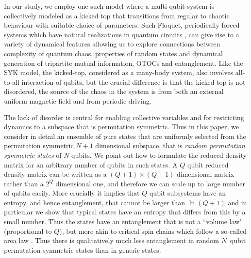 \documentclass[pre,aps,showpacs,showkeys,twocolumn]{revtex4-1}
\theoremstyle{definition}
\theoremstyle{remark}
\begin{document}
In our study, we employ one such model where a multi-qubit system is collectively modeled as a kicked top  \cite{Haake, kus1987symmetry, kus88, Zyczkowski90} that transitions from regular to chaotic behaviour with suitable choice of parameters. Such Floquet, periodically forced systems which have natural realizations in quantum circuits \cite{emerson2003pseudo}, can give rise to a variety of dynamical features allowing us to explore connections between complexity of quantum chaos, properties of random states and dynamical generation of tripartite mutual information, OTOCs and entanglement. Like the SYK model, the kicked-top, considered as a many-body system, also involves all-to-all interaction of qubits, but the crucial difference is that the kicked top is not disordered, the source of the chaos in the system is from both an external uniform magnetic field and from periodic driving. 

The lack of disorder is central for enabling collective variables and for restricting dynamics to a subspace that is permutation symmetric.   
Thus in this paper, we consider in detail an ensemble of pure states that are uniformly selected from the permutation symmetric $N + 1$ dimensional subspace, that is {\it random permutation symmetric states} of $N$ qubits. We point out how to formulate the reduced density matrix for an arbitrary number of qubits in such states. A $Q$ qubit reduced density matrix can be written as a $(Q+1) \times (Q+1)$ dimensional matrix rather than a $2^Q$ dimensional one, and therefore we can scale up to large number of qubits easily. More crucially it implies that $Q$ qubit subsystems have an entropy, and hence entanglement, that cannot be larger than $\ln(Q+1)$ and in particular we show that typical states have an entropy that differs from this by a small number. Thus the states have an entanglement that is not a ``volume law" (proportional to $Q$), but more akin to critical spin chains \cite{Vidal2003} which follow a so-called area law \cite{latorre2005entanglement, popkov2005entangling, popkov2005logarithmic, barthel2006entanglement, vidal2007entanglement}. Thus there is qualitatively much less entanglement in random $N$~qubit permutation symmetric states than in generic states.
\end{document}
